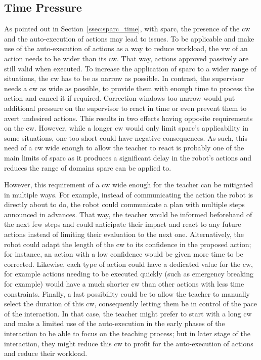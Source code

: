 \subsection{Time Pressure}
As pointed out in Section~\ref{ssec:sparc_time}, with \gls{sparc}, the presence of the \gls{cw} and the auto-execution of actions may lead to issues. To be applicable and make use of the auto-execution of actions as a way to reduce workload, the \gls{vw} of an action needs to be wider than its \gls{cw}. That way, actions approved passively are still valid when executed. To increase the application of \gls{sparc} to a wider range of situations, the \gls{cw} has to be as narrow as possible. In contrast, the supervisor needs a \gls{cw} as wide as possible, to provide them with enough time to process the action and cancel it if required. Correction windows too narrow would put additional pressure on the supervisor to react in time or even prevent them to avert undesired actions. %
This results in two effects having opposite requirements on the \gls{cw}. However, while a longer \gls{cw} would only limit \gls{sparc}'s applicability in some situations, one too short could have negative consequences. As such, this need of a \gls{cw} wide enough to allow the teacher to react is probably one of the main limits of \gls{sparc} as it produces a significant delay in the robot's actions and reduces the range of domains \gls{sparc} can be applied to.

However, this requirement of a \gls{cw} wide enough for the teacher can be mitigated in multiple ways. For example, instead of communicating the action the robot is directly about to do, the robot could communicate a plan with multiple steps announced in advances. That way, the teacher would be informed beforehand of the next few steps and could anticipate their impact and react to any future actions instead of limiting their evaluation to the next one. Alternatively, the robot could adapt the length of the \gls{cw} to its confidence in the proposed action; for instance, an action with a low confidence would be given more time to be corrected. Likewise, each type of action could have a dedicated value for the \gls{cw}, for example actions needing to be executed quickly (such as emergency breaking for example) would have a much shorter \gls{cw} than other actions with less time constraints. Finally, a last possibility could be to allow the teacher to manually select the duration of this \gls{cw}, consequently letting them be in control of the pace of the interaction. In that case, the teacher might prefer to start with a long \gls{cw} and make a limited use of the auto-execution in the early phases of the interaction to be able to focus on the teaching process; but in later stage of the interaction, they might reduce this \gls{cw} to profit for the auto-execution of actions and reduce their workload.



